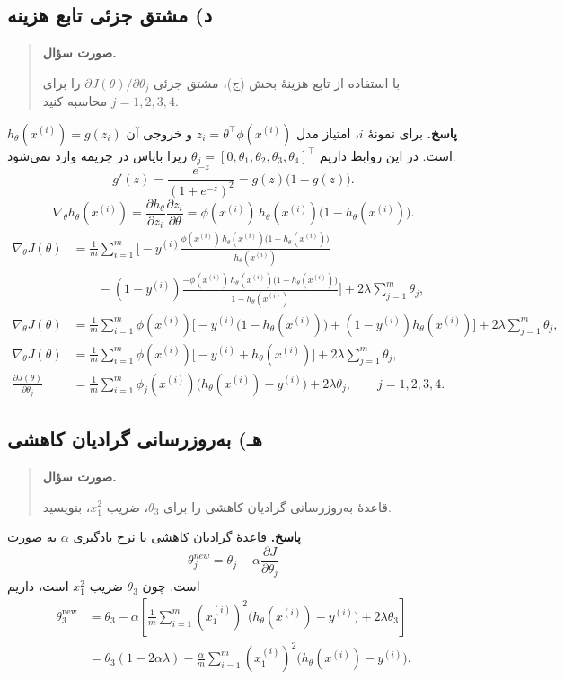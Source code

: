 \documentclass{article}
\numberwithin{equation}{section}
\numberwithin{table}{section}
\newenvironment{questionprompt}{%
    \begin{quote}\noindent\textbf{صورت سؤال.}\enspace\ignorespaces
}{%
    \end{quote}\noindent\textbf{پاسخ.}\enspace\ignorespacesafterend
}
\begin{document}
\subsection*{د) مشتق جزئی تابع هزینه}
\begin{questionprompt}
    با استفاده از تابع هزینهٔ بخش (ج)، مشتق جزئی \(\partial J(\theta)/\partial\theta_j\) را برای \(j=1,2,3,4\) محاسبه کنید.
\end{questionprompt}
برای نمونهٔ \(i\)، امتیاز مدل \(z_i=\theta^\top\phi(x^{(i)})\) و خروجی آن \(h_\theta(x^{(i)})=g(z_i)\) است. در این روابط داریم \(\theta_j=[0,\theta_1,\theta_2,\theta_3,\theta_4]^\top\) زیرا بایاس در جریمه وارد نمی‌شود.
\[
    g'(z)=\frac{e^{-z}}{(1+e^{-z})^2}=g(z)\bigl(1-g(z)\bigr).
\]
\[
    \nabla_\theta h_\theta(x^{(i)})=\frac{\partial h_\theta}{\partial z_i}\frac{\partial z_i}{\partial \theta}
      =\phi(x^{(i)})\,h_\theta(x^{(i)})
          \bigl(1-h_\theta(x^{(i)})\bigr).
\]
\begin{align*}
    \nabla_\theta J(\theta)
      &=\frac{1}{m}\sum_{i=1}^{m}\Biggl[
         -y^{(i)}
         \frac{\phi(x^{(i)})\,h_\theta(x^{(i)})
               \bigl(1-h_\theta(x^{(i)})\bigr)}
              {h_\theta(x^{(i)})}\\
      &\qquad -(1-y^{(i)})
         \frac{-\phi(x^{(i)})\,h_\theta(x^{(i)})
                \bigl(1-h_\theta(x^{(i)})\bigr)}
              {1-h_\theta(x^{(i)})}
         \Biggr]+2\lambda \sum_{j=1}^{m}\theta_j,\\[0.5em]
    \nabla_\theta J(\theta)
      &=\frac{1}{m}\sum_{i=1}^{m}\phi(x^{(i)})
         \bigl[-y^{(i)}\bigl(1-h_\theta(x^{(i)})\bigr)
           +(1-y^{(i)})h_\theta(x^{(i)})\bigr]
         +2\lambda \sum_{j=1}^{m}\theta_j,\\[0.5em]
    \nabla_\theta J(\theta)
      &=\frac{1}{m}\sum_{i=1}^{m}\phi(x^{(i)})
         \bigl[-y^{(i)}+h_\theta(x^{(i)})\bigr]
         +2\lambda \sum_{j=1}^{m}\theta_j,\\[0.5em]
    \frac{\partial J(\theta)}{\partial\theta_j}
      &=\frac{1}{m}\sum_{i=1}^{m}\phi_j(x^{(i)})
         \bigl(h_\theta(x^{(i)})-y^{(i)}\bigr)
         +2\lambda\theta_j,\qquad j=1,2,3,4.
\end{align*}

\subsection*{هـ) به‌روزرسانی گرادیان کاهشی}
\begin{questionprompt}
    قاعدهٔ به‌روزرسانی گرادیان کاهشی را برای \(\theta_3\)، ضریب \(x_1^2\)، بنویسید.
\end{questionprompt}
قاعدهٔ گرادیان کاهشی با نرخ یادگیری \(\alpha\) به صورت
\[
    \theta_j^{new}=\theta_j-\alpha\frac{\partial J}{\partial\theta_j}
\]
است. چون \(\theta_3\) ضریب \(x_1^2\) است، داریم
\begin{align*}
    \theta_3^{\mathrm{new}}
      &=\theta_3-\alpha\left[
         \frac1m\sum_{i=1}^{m}(x_1^{(i)})^2
          \bigl(h_\theta(x^{(i)})-y^{(i)}\bigr)+2\lambda\theta_3
         \right]\\
      &=\theta_3(1-2\alpha\lambda)
         -\frac{\alpha}{m}\sum_{i=1}^{m}(x_1^{(i)})^2
           \bigl(h_\theta(x^{(i)})-y^{(i)}\bigr).
\end{align*}
\end{document}

